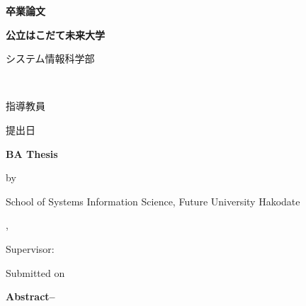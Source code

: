 \documentclass[uplatex, a4paper, report, 11pt, oneside]{jsbook}
\begin{document}
\thispagestyle{empty}
\vspace*{2truemm}
\begin{center}
    \LARGE\bfseries
    卒業論文
\end{center}
\vspace*{2truemm}
\begin{center}
    \LARGE\bfseries\jtitle
\end{center}
\vspace*{1em}
\begin{center}
    \large\bfseries 公立はこだて未来大学\par%
    システム情報科学部~~\jdepartment\par%
    \jcourse~~\studentID
\end{center}
\vspace*{1em}
\begin{center}
    \Large\bfseries\jauthor
\end{center}
\vspace*{1em}
\begin{center}
    \large 指導教員~~~~\jadvisor\par
    \vspace{0.5em}
    \large 提出日~~~~\jdate
\end{center}
\vspace*{3em}
\begin{center}
\textbf{\Large BA Thesis}\par
\vspace*{2em}
\textbf{\Large \etitle}\par
\vspace*{1em}
{\normalsize by}\par
\vspace*{1em}
{\large \eauthor}\par
\vspace*{1.5em}
School of Systems Information Science, Future University Hakodate \par
\ecourse, \edepartment

\normalsize Supervisor: \quad \eadvisor \par
\vspace*{2em}
Submitted on \edate
\end{center}
\vspace*{\fill}

\newpage
\thispagestyle{empty}
\noindent
\textbf{Abstract--}~
\eabstract
\end{document}
